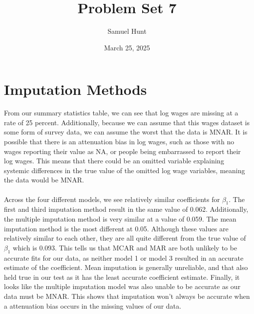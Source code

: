 \documentclass{article}
\title{Problem Set 7}
\author{Samuel Hunt}
\date{March 25, 2025}
\begin{document}
\maketitle  %

\section{Imputation Methods}
From our summary statistics table, we can see that log wages are missing at a rate of 25 percent. Additionally, because we can assume that this wages dataset is some form of survey data, we can assume the worst that the data is MNAR. It is possible that there is an attenuation bias in log wages, such as those with no wages reporting their value as NA, or people being embarrassed to report their log wages. This means that there could be an omitted variable explaining systemic differences in the true value of the omitted log wage variables, meaning the data would be MNAR.
\\
\\Across the four different models, we see relatively similar coefficients for $\beta_1$. The first and third imputation method result in the same value of 0.062. Additionally, the multiple imputation method is very similar at a value of 0.059. The mean imputation method is the most different at 0.05. Although these values are relatively similar to each other, they are all quite different from the true value of $\beta_1$ which is 0.093. This tells us that MCAR and MAR are both unlikely to be accurate fits for our data, as neither model 1 or model 3 resulted in an accurate estimate of the coefficient. Mean imputation is generally unreliable, and that also held true in our test as it has the least accurate coefficient estimate. Finally, it looks like the multiple imputation model was also unable to be accurate as our data must be MNAR. This shows that imputation won't always be accurate when a attenuation bias occurs in the missing values of our data.
\end{document}

